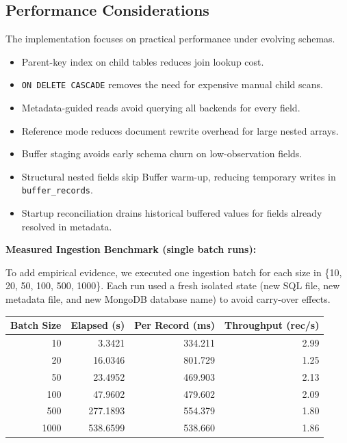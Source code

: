 \documentclass[12pt,a4paper]{article}
\begin{document}
\subsection{Performance Considerations}
The implementation focuses on practical performance under evolving schemas.

\begin{itemize}[leftmargin=*]
  \item Parent-key index on child tables reduces join lookup cost.
  \item \texttt{ON DELETE CASCADE} removes the need for expensive manual child scans.
  \item Metadata-guided reads avoid querying all backends for every field.
  \item Reference mode reduces document rewrite overhead for large nested arrays.
  \item Buffer staging avoids early schema churn on low-observation fields.
  \item Structural nested fields skip Buffer warm-up, reducing temporary writes in \texttt{buffer\_records}.
  \item Startup reconciliation drains historical buffered values for fields already resolved in metadata.
\end{itemize}

\textbf{Measured Ingestion Benchmark (single batch runs):}

To add empirical evidence, we executed one ingestion batch for each size in \{10, 20, 50, 100, 500, 1000\}. Each run used a fresh isolated state (new SQL file, new metadata file, and new MongoDB database name) to avoid carry-over effects.

\begin{center}
\begin{tabular}{r r r r}
\toprule
\textbf{Batch Size} & \textbf{Elapsed (s)} & \textbf{Per Record (ms)} & \textbf{Throughput (rec/s)} \\
\midrule
10 & 3.3421 & 334.211 & 2.99 \\
20 & 16.0346 & 801.729 & 1.25 \\
50 & 23.4952 & 469.903 & 2.13 \\
100 & 47.9602 & 479.602 & 2.09 \\
500 & 277.1893 & 554.379 & 1.80 \\
1000 & 538.6599 & 538.660 & 1.86 \\
\bottomrule
\end{tabular}
\end{center}
\end{document}
